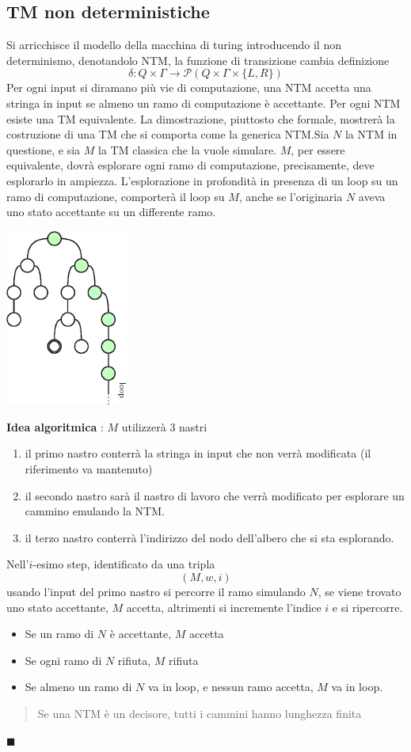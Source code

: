 \documentclass[10pt, letterpaper]{report}
\begin{document}
\subsection{TM non deterministiche}
Si arricchisce il modello della macchina di turing introducendo il non determinismo, denotandolo NTM, la funzione di transizione cambia definizione 
$$ \delta : Q\times\Gamma \rightarrow \mathcal{P}(Q\times \Gamma \times \{L,R\})$$
Per ogni input si diramano più vie di computazione, una NTM accetta una stringa in input se almeno un ramo di computazione è accettante.\acc 
{} Per ogni NTM esiste una TM equivalente.\acc 
\dimo{} La dimostrazione, piuttosto che formale, mostrerà la costruzione di una 
TM che si comporta come la generica NTM.\acc Sia $N$ la NTM in questione, e sia $M$ la TM classica che la vuole 
simulare. $M$, per essere equivalente, dovrà esplorare ogni ramo di computazione, precisamente, deve esplorarlo in ampiezza. L'esplorazione in profondità in presenza di un loop su un ramo di computazione, comporterà il loop su $M$, anche se l'originaria $N$ aveva uno stato accettante su un differente ramo. \begin{center}
    \includegraphics[width=0.3\textwidth ]{images/loopEAccettante.eps} 
\end{center}
\textbf{Idea algoritmica} : $M$ utilizzerà 3 nastri\begin{enumerate}
    \item il primo nastro conterrà la stringa in input che non verrà modificata (il riferimento va mantenuto)
    \item il secondo nastro sarà il nastro di lavoro che verrà modificato per esplorare un cammino emulando la NTM.
    \item il terzo nastro conterrà l'indirizzo del nodo 
    dell'albero che si sta esplorando.
\end{enumerate}
Nell'$i$-esimo step, identificato da una tripla 
$$ (M,w,i)$$
usando l'input del primo nastro si percorre il ramo simulando $N$, se viene trovato uno stato accettante, 
$M$ accetta, altrimenti si incremente l'indice $i$
 e si ripercorre.
 \begin{itemize}
    \item Se un ramo di $N$ è accettante, $M$ accetta 
    \item Se ogni ramo di $N$ rifiuta, $M$ rifiuta 
    \item Se almeno un ramo di $N$ va in loop, e nessun 
    ramo accetta, $M$ va in loop.
 \end{itemize}
 \begin{quote}
    Se una NTM è un decisore, tutti i cammini hanno lunghezza finita
 \end{quote}
 \hfill$\blacksquare$
\end{document}
